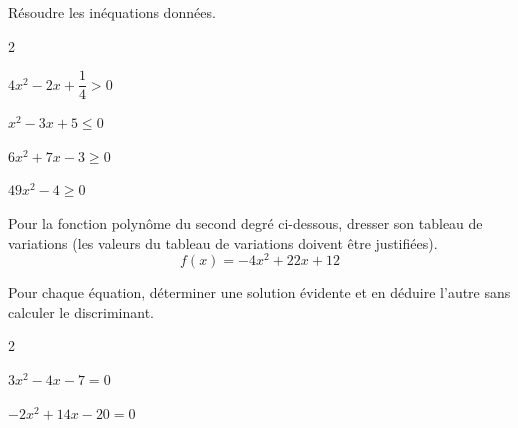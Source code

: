 \documentclass[12pt,a4paper]{article}  %
\begin{document}
\vspace{-0.3cm}

Résoudre les inéquations données.
\begin{multicols}{2}
\begin{enumMet}
    \item $4 x^{2}-2 x+\dfrac{1}{4}>0$ 
    \item $x^{2}-3 x+5 \leqslant 0$ 
    \item $6 x^{2}+7 x-3 \geqslant 0$ 
    \item $49 x^{2}-4 \geqslant 0$ 
\end{enumMet}
\end{multicols}

\vspace{-0.3cm}
Pour la fonction polynôme du second degré ci-dessous, dresser son tableau de variations (les valeurs du tableau de variations doivent être justifiées).
$$f(x)=-4x^2+22x+12$$

\vspace{-0.3cm}

Pour chaque équation, déterminer une solution évidente et en déduire l'autre sans calculer le discriminant.
\begin{multicols}{2}
\begin{enumMet}
    \item $3x^2-4x-7=0$ 
    \item $-2x^2+14x-20=0$ 
\end{enumMet}
\end{multicols}

\newpage

%
%
%
%
\end{document}
